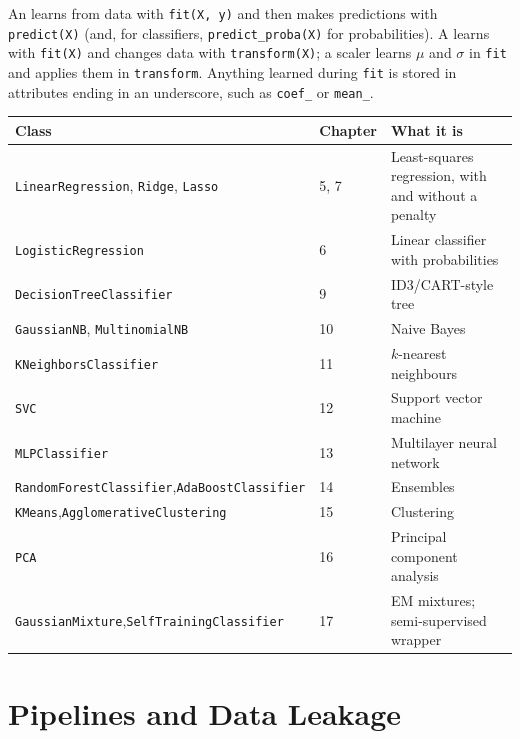 \begin{definitionbox}
An  learns from data with \texttt{fit(X, y)} and then makes
predictions with \texttt{predict(X)} (and, for classifiers,
\texttt{predict\_proba(X)} for probabilities). A  learns with
\texttt{fit(X)} and changes data with \texttt{transform(X)}; a scaler learns
$\mu$ and $\sigma$ in \texttt{fit} and applies them in \texttt{transform}. Anything
learned during \texttt{fit} is stored in attributes ending in an underscore, such
as \texttt{coef\_} or \texttt{mean\_}.
\end{definitionbox}

\begin{longtable}{@{}L{5.9cm}L{1.9cm}L{7.2cm}@{}}
\toprule
{}
\textbf{Class} & \textbf{Chapter} & \textbf{What it is} \\
\midrule
\endhead
\texttt{LinearRegression}, \texttt{Ridge}, \texttt{Lasso} & 5, 7 & Least-squares
regression, with and without a penalty \\
\texttt{LogisticRegression} & 6 & Linear classifier with probabilities \\
\texttt{DecisionTreeClassifier} & 9 & ID3/CART-style tree \\
\texttt{GaussianNB}, \texttt{MultinomialNB} & 10 & Naive Bayes \\
\texttt{KNeighborsClassifier} & 11 & $k$-nearest neighbours \\
\texttt{SVC} & 12 & Support vector machine \\
\texttt{MLPClassifier} & 13 & Multilayer neural network \\
\texttt{RandomForestClassifier},\newline \texttt{AdaBoostClassifier} & 14 & Ensembles \\
\texttt{KMeans},\newline \texttt{AgglomerativeClustering} & 15 & Clustering \\
\texttt{PCA} & 16 & Principal component analysis \\
\texttt{GaussianMixture},\newline \texttt{SelfTrainingClassifier} & 17 & EM mixtures;
semi-supervised wrapper \\
\bottomrule
\end{longtable}

\section{Pipelines and Data Leakage}

